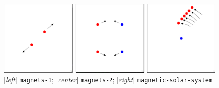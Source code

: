 \documentclass{article}
\begin{document}
\begin{figure}[h!]
  \centering
 \includegraphics[width=\textwidth,height=\textheight,keepaspectratio]{figs/magnetism.png}
  \caption{[\textit{left}] \texttt{magnets-1}; [\textit{center}] \texttt{magnets-2}; [\textit{right}] \texttt{magnetic-solar-system}}
  \label{figure:magnetism}
\end{figure}
\end{document}
